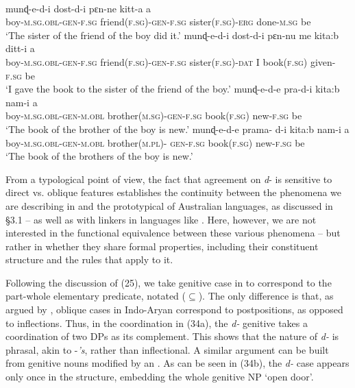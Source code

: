 \documentclass[output=paper]{langsci/langscibook}
\begin{document}
\ea%
    \label{ex:manzini:33}\\
    \begin{xlista}
    \ex
    \gll     munɖ-e-d-i   dost-d-i   pɛn-ne    kitt-a         a  \\
             boy-\textsc{m.sg.obl-gen-f.sg}  friend\textsc{(f.sg)-gen-f.sg}  sister\textsc{(f.sg)-erg}    done-\textsc{m.sg}   be\\
    \glt     ‘The sister of the friend of the boy did it.’
    \gll    munɖ-e-d-i    dost-d-i   pɛn-nu  me  kita:b         ditt-i   a \\
             boy-\textsc{m.sg.obl-gen-f.sg}  friend\textsc{(f.sg)-gen-f.sg}  sister\textsc{(f.sg)-dat}   I          book\textsc{(f.sg)}   given\textsc{{}-f.sg}   be\\
    \glt     ‘I gave the book to the sister of the friend of the boy.’
    \ex      
    \gll    munɖ-e-d-e   pra-d-i   kita:b   nam-i    a \\
             boy-\textsc{m.sg.obl-gen-m.obl}  brother\textsc{(m.sg)-gen-f.sg}  book\textsc{(f.sg)}   new-\textsc{f.sg} be \\
    \glt     ‘The book of the brother of the boy is new.’
    \gll     munɖ-e-d-e   prama-  d-i   kita:b   nam-i       a\\
             boy-\textsc{m.sg.obl-gen-m.obl}  brother\textsc{(m.pl)-}  \textsc{gen-f.sg}   book\textsc{(f.sg)}   new-\textsc{f.sg} be \\
    \glt     ‘The book of the brothers of the boy is new.’
    \end{xlista}
    \z
    
From a typological point of view, the fact that agreement on \textit{d}{}- is sensitive to direct vs. oblique features establishes the continuity between the phenomena we are describing in  and the prototypical  of Australian languages, as discussed in §3.1 – as well as with linkers in languages like . Here, however, we are not interested in the functional equivalence between these various phenomena – but rather in whether they share formal properties, including their constituent structure and the rules that apply to it.    

Following the discussion of  (25), we take genitive case in  to correspond to the part-whole elementary predicate, notated ($\subseteq$). The only difference is that, as argued by \citet{Payne1995}, oblique cases in Indo-Aryan correspond to postpositions, as opposed to inflections. Thus, in the coordination in (34a), the \textit{d-} genitive  takes a coordination of two DPs as its complement. This shows that the nature of \textit{d-} is phrasal, akin to  -\textit{’s}, rather than inflectional. A similar argument can be built from genitive nouns modified by an . As can be seen in (34b), the \textit{d-} case  appears only once in the structure, embedding the whole genitive NP ‘open door’.
\end{document}
